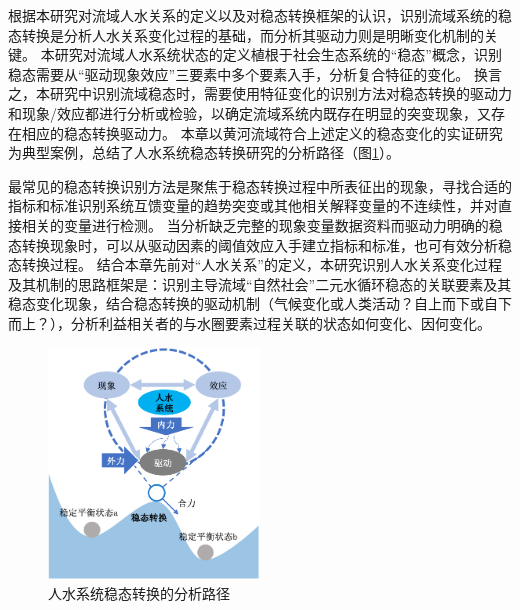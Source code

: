 根据本研究对流域人\textendash{}水关系的定义以及对稳态转换框架的认识，识别流域系统的稳态转换是分析人\textendash{}水关系变化过程的基础，而分析其驱动力则是明晰变化机制的关键。
本研究对流域人\textendash{}水系统状态的定义植根于社会\textendash{}生态系统的“稳态”概念，识别稳态需要从“驱动\textendash{}现象\textendash{}效应”三要素中多个要素入手，分析复合特征的变化。
换言之，本研究中识别流域稳态时，需要使用特征变化的识别方法对稳态转换的驱动力和现象/效应都进行分析或检验，以确定流域系统内既存在明显的突变现象，又存在相应的稳态转换驱动力。
本章以黄河流域符合上述定义的稳态变化的实证研究为典型案例，总结了人\textendash{}水系统稳态转换研究的分析路径（图\ref{ch2:fig:identifying}）。

最常见的稳态转换识别方法是聚焦于稳态转换过程中所表征出的现象，寻找合适的指标和标准识别系统互馈变量的趋势突变或其他相关解释变量的不连续性，并对直接相关的变量进行检测。
当分析缺乏完整的现象变量数据资料而驱动力明确的稳态转换现象时，可以从驱动因素的阈值效应入手建立指标和标准，也可有效分析稳态转换过程。
结合本章先前对“人\textendash{}水关系”的定义，本研究识别人\textendash{}水关系变化过程及其机制的思路框架是：识别主导流域“自然\textendash{}社会”二元水循环稳态的关联要素及其稳态变化现象，结合稳态转换的驱动机制（气候变化或人类活动？自上而下或自下而上？），分析利益相关者的与水圈要素过程关联的状态如何变化、因何变化。

\begin{figure}[!ht] %
    \centering
    \includegraphics[width=0.5\textwidth]{img/ch2/ch2_framework.png}
    \caption{人\textendash{}水系统稳态转换的分析路径}\label{ch2:fig:identifying}
\end{figure}

